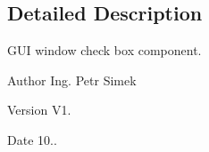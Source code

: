 \subsection{Detailed Description}
G\+UI window check box component. 

\begin{DoxyAuthor}{Author}
Ing. Petr Simek 
\end{DoxyAuthor}
\begin{DoxyVersion}{Version}
V1. 
\end{DoxyVersion}
\begin{DoxyDate}{Date}
10.. 
\end{DoxyDate}
